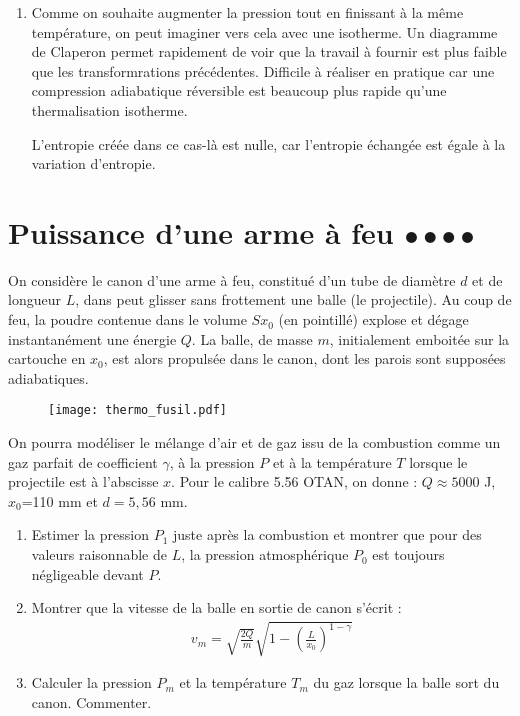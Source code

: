 \begin{correction}
\begin{enumerate}
\begin{enumerate}
\end{enumerate}

\item Comme on souhaite augmenter la pression tout en finissant à la même température, on peut imaginer vers cela avec une isotherme. Un diagramme de Claperon permet rapidement de voir que la travail à fournir est plus faible que les transformrations précédentes. Difficile à réaliser en pratique car une compression adiabatique réversible est beaucoup plus rapide qu'une thermalisation isotherme.

L'entropie créée dans ce cas-là est nulle, car l'entropie échangée est égale à la variation d'entropie.

\end{enumerate}

\end{correction}

\newpage

\section{Puissance d'une arme à feu $\bullet\bullet\bullet\bullet$}

On considère le canon d'une arme à feu, constitué d'un tube de diamètre $d$ et de longueur $L$, dans peut glisser sans frottement une balle (le projectile). Au coup de feu, la poudre contenue dans le volume $Sx_0$ (en pointillé) explose et dégage instantanément une énergie $Q$. La balle, de masse $m$, initialement emboitée sur la cartouche en $x_0$, est alors propulsée dans le canon, dont les parois sont supposées adiabatiques.

\begin{figure}[h!]
\centering
  \texttt{[image: thermo\_fusil.pdf]}
\end{figure}

On pourra modéliser le mélange d'air et de gaz issu de la combustion comme un gaz parfait de coefficient $\gamma$, à la pression $P$ et à la température $T$ lorsque le projectile est à l'abscisse $x$. Pour le calibre 5.56 OTAN, on donne : $Q\approx5000$ J, $x_0$=110 mm et $d=5,56$ mm.

\begin{enumerate}

	\item Estimer la pression $P_1$ juste après la combustion et montrer que pour des valeurs raisonnable de $L$, la pression atmosphérique $P_0$ est toujours négligeable devant $P$.
	
	\item Montrer que la vitesse de la balle en sortie de canon s'écrit :
	\begin{align*}
		v_m=\sqrt{\frac{2Q}{m}}\sqrt{1-\left(\frac{L}{x_0} \right)^{1-\gamma}}
	\end{align*}
	
	\item Calculer la pression $P_m$ et la température $T_m$ du gaz lorsque la balle sort du canon. Commenter.

\end{enumerate}